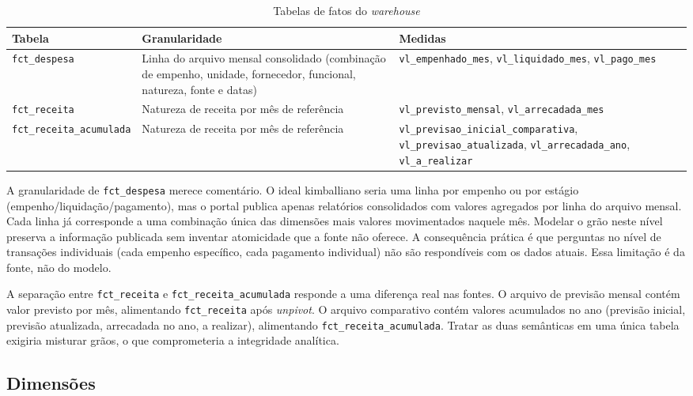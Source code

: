 \begin{table}[htb]
\caption{Tabelas de fatos do \textit{warehouse}}
\label{tab:fatos}
\centering
\small
\begin{tabular}{p{3.0cm} p{4.5cm} p{6.0cm}}
\hline
\textbf{Tabela} & \textbf{Granularidade} & \textbf{Medidas} \\
\hline
\texttt{fct\_despesa} & Linha do arquivo mensal consolidado (combinação de empenho, unidade, fornecedor, funcional, natureza, fonte e datas) & \texttt{vl\_empenhado\_mes}, \texttt{vl\_liquidado\_mes}, \texttt{vl\_pago\_mes} \\
\texttt{fct\_receita} & Natureza de receita por mês de referência & \texttt{vl\_previsto\_mensal}, \texttt{vl\_arrecadada\_mes} \\
\texttt{fct\_receita\_acumulada} & Natureza de receita por mês de referência & \texttt{vl\_previsao\_inicial\_comparativa}, \texttt{vl\_previsao\_atualizada}, \texttt{vl\_arrecadada\_ano}, \texttt{vl\_a\_realizar} \\
\hline
\end{tabular}
\end{table}

A granularidade de \texttt{fct\_despesa} merece comentário. O ideal kimballiano seria uma linha por empenho ou por estágio (empenho/liquidação/pagamento), mas o portal publica apenas relatórios consolidados com valores agregados por linha do arquivo mensal. Cada linha já corresponde a uma combinação única das dimensões mais valores movimentados naquele mês. Modelar o grão neste nível preserva a informação publicada sem inventar atomicidade que a fonte não oferece. A consequência prática é que perguntas no nível de transações individuais (cada empenho específico, cada pagamento individual) não são respondíveis com os dados atuais. Essa limitação é da fonte, não do modelo.

A separação entre \texttt{fct\_receita} e \texttt{fct\_receita\_acumulada} responde a uma diferença real nas fontes. O arquivo de previsão mensal contém valor previsto por mês, alimentando \texttt{fct\_receita} após \textit{unpivot}. O arquivo comparativo contém valores acumulados no ano (previsão inicial, previsão atualizada, arrecadada no ano, a realizar), alimentando \texttt{fct\_receita\_acumulada}. Tratar as duas semânticas em uma única tabela exigiria misturar grãos, o que comprometeria a integridade analítica.

\subsection{Dimensões}

